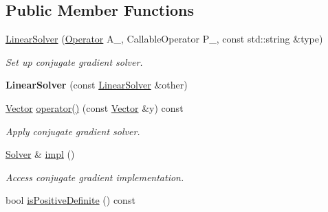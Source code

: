 \subsection*{Public Member Functions}
\begin{DoxyCompactItemize}
\item 
\hyperlink{classSpacy_1_1CG_1_1LinearSolver_a32f75ae5c449772649af6306b6f68497}{Linear\+Solver} (\hyperlink{classSpacy_1_1Operator}{Operator} A\+\_\+, Callable\+Operator P\+\_\+, const std\+::string \&type)
\begin{DoxyCompactList}\small\item\em Set up conjugate gradient solver. \end{DoxyCompactList}\item 
\hypertarget{classSpacy_1_1CG_1_1LinearSolver_a3c08d3c861d612d92168a350bc66c7dd}{}{\bfseries Linear\+Solver} (const \hyperlink{classSpacy_1_1CG_1_1LinearSolver}{Linear\+Solver} \&other)\label{classSpacy_1_1CG_1_1LinearSolver_a3c08d3c861d612d92168a350bc66c7dd}

\item 
\hypertarget{classSpacy_1_1CG_1_1LinearSolver_a5ee58f9858d840621a44658ceb721850}{}\hyperlink{classSpacy_1_1Vector}{Vector} \hyperlink{classSpacy_1_1CG_1_1LinearSolver_a5ee58f9858d840621a44658ceb721850}{operator()} (const \hyperlink{classSpacy_1_1Vector}{Vector} \&y) const \label{classSpacy_1_1CG_1_1LinearSolver_a5ee58f9858d840621a44658ceb721850}

\begin{DoxyCompactList}\small\item\em Apply conjugate gradient solver. \end{DoxyCompactList}\item 
\hypertarget{classSpacy_1_1CG_1_1LinearSolver_aa0aa5fdfdfd66e186fc86c35d7b49df6}{}\hyperlink{classSpacy_1_1CG_1_1Solver}{Solver} \& \hyperlink{classSpacy_1_1CG_1_1LinearSolver_aa0aa5fdfdfd66e186fc86c35d7b49df6}{impl} ()\label{classSpacy_1_1CG_1_1LinearSolver_aa0aa5fdfdfd66e186fc86c35d7b49df6}

\begin{DoxyCompactList}\small\item\em Access conjugate gradient implementation. \end{DoxyCompactList}\item 
\hypertarget{classSpacy_1_1CG_1_1LinearSolver_adec5404c595dc514a9c81c9ccc06cf41}{}bool \hyperlink{classSpacy_1_1CG_1_1LinearSolver_adec5404c595dc514a9c81c9ccc06cf41}{is\+Positive\+Definite} () const \label{classSpacy_1_1CG_1_1LinearSolver_adec5404c595dc514a9c81c9ccc06cf41}


\end{DoxyCompactItemize}
